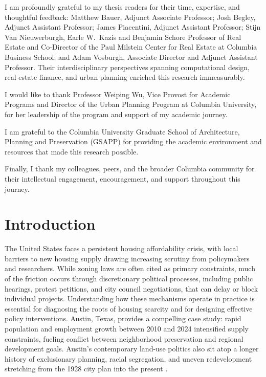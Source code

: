 \documentclass[11pt, letterpaper, oneside]{article}
\begin{document}
I am profoundly grateful to my thesis readers for their time, expertise, and thoughtful feedback: Matthew Bauer, Adjunct Associate Professor; Josh Begley, Adjunct Assistant Professor; James Piacentini, Adjunct Assistant Professor; Stijn Van Nieuwerburgh, Earle W.\ Kazis and Benjamin Schore Professor of Real Estate and Co-Director of the Paul Milstein Center for Real Estate at Columbia Business School; and Adam Vosburgh, Associate Director and Adjunct Assistant Professor. Their interdisciplinary perspectives spanning computational design, real estate finance, and urban planning enriched this research immeasurably.

I would like to thank Professor Weiping Wu, Vice Provost for Academic Programs and Director of the Urban Planning Program at Columbia University, for her leadership of the program and support of my academic journey.

I am grateful to the Columbia University Graduate School of Architecture, Planning and Preservation (GSAPP) for providing the academic environment and resources that made this research possible.

Finally, I thank my colleagues, peers, and the broader Columbia community for their intellectual engagement, encouragement, and support throughout this journey.

\newpage
\tableofcontents
\newpage
\listoffigures
\newpage
\listoftables
\newpage
\cleardoublepage
{}
\section{Introduction}

The United States faces a persistent housing affordability crisis, with local barriers to new housing supply drawing increasing scrutiny from policymakers and researchers. While zoning laws are often cited as primary constraints, much of the friction occurs through discretionary political processes, including public hearings, protest petitions, and city council negotiations, that can delay or block individual projects. Understanding how these mechanisms operate in practice is essential for diagnosing the roots of housing scarcity and for designing effective policy interventions. Austin, Texas, provides a compelling case study: rapid population and employment growth between 2010 and 2024 intensified supply constraints, fueling conflict between neighborhood preservation and regional development goals. Austin's contemporary land-use politics also sit atop a longer history of exclusionary planning, racial segregation, and uneven redevelopment stretching from the 1928 city plan into the present \cite{cityaustin1928,way2018,whittemore2014racial,richardson2019dirty}.
\end{document}
